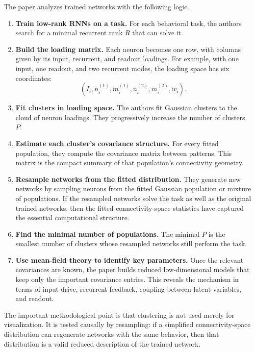 \documentclass[11pt]{article}
\begin{document}
The paper analyzes trained networks with the following logic.

\begin{enumerate}
  \item \textbf{Train low-rank RNNs on a task.} For each behavioral task, the
  authors search for a minimal recurrent rank $R$ that can solve it.

  \item \textbf{Build the loading matrix.} Each neuron becomes one row, with
  columns given by its input, recurrent, and readout loadings. For example, with
  one input, one readout, and two recurrent modes, the loading space has six
  coordinates:
  \[
    (I_i,n_i^{(1)},m_i^{(1)},n_i^{(2)},m_i^{(2)},w_i).
  \]

  \item \textbf{Fit clusters in loading space.} The authors fit Gaussian
  clusters to the cloud of neuron loadings. They progressively increase the
  number of clusters $P$.

  \item \textbf{Estimate each cluster's covariance structure.} For every fitted
  population, they compute the covariance matrix between patterns. This matrix
  is the compact summary of that population's connectivity geometry.

  \item \textbf{Resample networks from the fitted distribution.} They generate
  new networks by sampling neurons from the fitted Gaussian population or mixture
  of populations. If the resampled networks solve the task as well as the
  original trained networks, then the fitted connectivity-space statistics have
  captured the essential computational structure.

  \item \textbf{Find the minimal number of populations.} The minimal $P$ is the
  smallest number of clusters whose resampled networks still perform the task.

  \item \textbf{Use mean-field theory to identify key parameters.} Once the
  relevant covariances are known, the paper builds reduced low-dimensional
  models that keep only the important covariance entries. This reveals the
  mechanism in terms of input drive, recurrent feedback, coupling between
  latent variables, and readout.
\end{enumerate}

The important methodological point is that clustering is not used merely for
visualization. It is tested causally by resampling: if a simplified
connectivity-space distribution can regenerate networks with the same behavior,
then that distribution is a valid reduced description of the trained network.
\end{document}
